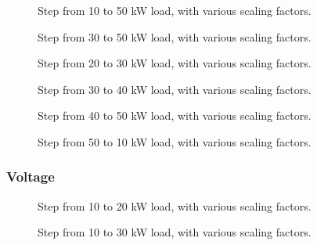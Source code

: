 \begin{figure}[H]
\centering

\caption{Step from 10 to 50 kW load, with various scaling factors.}
\label{fig:test11-14-10to50kwsteppower}
\end{figure}

\begin{figure}[H]
\centering

\caption{Step from 30 to 50 kW load, with various scaling factors.}
\label{fig:test11-14-30to50kwsteppower}
\end{figure}

\begin{figure}[H]
\centering

\caption{Step from 20 to 30 kW load, with various scaling factors.}
\label{fig:test11-14-20to30kwsteppower}
\end{figure}

\begin{figure}[H]
\centering

\caption{Step from 30 to 40 kW load, with various scaling factors.}
\label{fig:test11-14-30to40kwsteppower}
\end{figure}

\begin{figure}[H]
\centering

\caption{Step from 40 to 50 kW load, with various scaling factors.}
\label{fig:test11-14-40to50kwsteppower}
\end{figure}

\begin{figure}[H]
\centering

\caption{Step from 50 to 10 kW load, with various scaling factors.}
\label{fig:test11-14-50to10kwsteppower}
\end{figure}

\subsubsection{Voltage}

\begin{figure}[H]
\centering

\caption{Step from 10 to 20 kW load, with various scaling factors.}
\label{fig:test11-14-10to20kwstepvolt}
\end{figure}

\begin{figure}[H]
\centering

\caption{Step from 10 to 30 kW load, with various scaling factors.}
\label{fig:test11-14-10to30kwstepvolt}
\end{figure}

